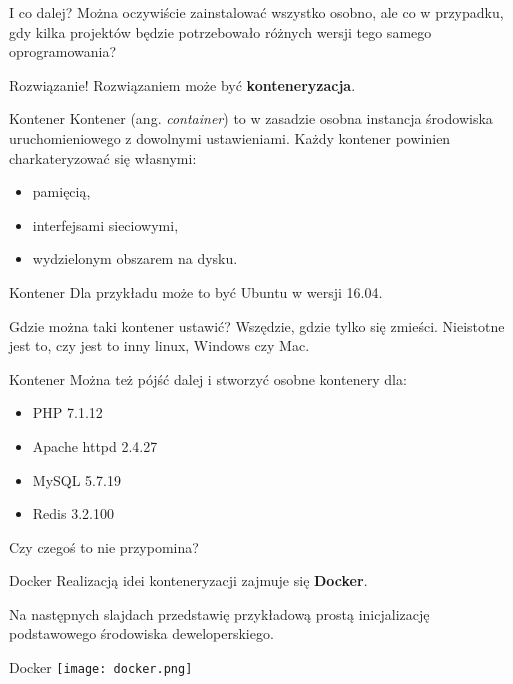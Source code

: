 \begin{frame}{I co dalej?}
	Można oczywiście zainstalować wszystko osobno, ale co w przypadku, gdy kilka projektów będzie potrzebowało różnych wersji tego samego oprogramowania?
\end{frame}

\begin{frame}{Rozwiązanie!}
	Rozwiązaniem może być \textbf{konteneryzacja}.
\end{frame}

\begin{frame}{Kontener}
	Kontener (ang. \emph{container}) to w zasadzie osobna instancja środowiska uruchomieniowego z dowolnymi ustawieniami. Każdy kontener powinien charkateryzować się własnymi:
	\begin{itemize}
		\item pamięcią,
		\item interfejsami sieciowymi,
		\item wydzielonym obszarem na dysku.
	\end{itemize}
\end{frame}

\begin{frame}{Kontener}
	Dla przykładu może to być Ubuntu w wersji 16.04. 
	
	Gdzie można taki kontener ustawić? Wszędzie, gdzie tylko się zmieści. Nieistotne jest to, czy jest to inny linux, Windows czy Mac.
\end{frame}

\begin{frame}{Kontener}
	Można też pójść dalej i stworzyć osobne kontenery dla:
	\begin{itemize}
		\item PHP 7.1.12
		\item Apache httpd 2.4.27
		\item MySQL 5.7.19
		\item Redis 3.2.100
	\end{itemize}
	
	Czy czegoś to nie przypomina?
\end{frame}

\begin{frame}{Docker}
	Realizacją idei konteneryzacji zajmuje się \textbf{Docker}.
	
	Na następnych slajdach przedstawię przykładową prostą inicjalizację podstawowego środowiska deweloperskiego.
\end{frame}

\begin{frame}{Docker}
	\centering
	\texttt{[image: docker.png]}
\end{frame}

